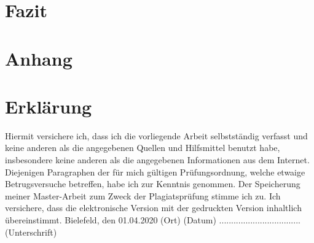 \documentclass[
        ngerman,
        paper=a4,
        numbers=noendperiod,
]{scrreprt}
\begin{document}
\chapter{Fazit}
\appendix 
\chapter{Anhang}
\label{chapter:Anhang}%


\clearpage
        
        
        




\chapter*{Erklärung}
Hiermit versichere ich, dass ich die vorliegende Arbeit selbstständig verfasst und keine anderen als die angegebenen Quellen und Hilfsmittel benutzt habe, insbesondere keine anderen als die angegebenen Informationen aus dem Internet. Diejenigen Paragraphen der für mich gültigen Prüfungsordnung, welche etwaige Betrugsversuche betreffen, habe ich zur Kenntnis genommen. Der Speicherung meiner Master-Arbeit zum Zweck der Plagiatsprüfung stimme ich zu. Ich versichere, dass die elektronische Version mit der gedruckten Version inhaltlich übereinstimmt.\newline
\linebreak
\linebreak
\linebreak
Bielefeld, den 01.04.2020\newline
(Ort) (Datum)\newline
\linebreak
\linebreak
\linebreak
..................................\newline
(Unterschrift)
\end{document}
